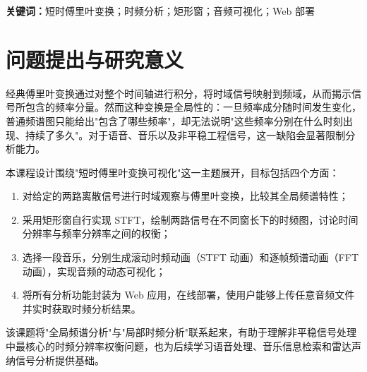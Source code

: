 \documentclass[12pt,a4paper,UTF8]{ctexart}
\begin{document}
\cover
\thispagestyle{empty}

\newpage
\setcounter{page}{1}

\begin{abstract}
傅里叶变换能够揭示信号的全局频率组成，但无法回答"某个频率在什么时候出现"这一时变分析问题。针对该局限，本文围绕短时傅里叶变换（Short-Time Fourier Transform, STFT）展开课程设计。首先，通过 \texttt{waveform.py} 绘制两路离散信号的时域波形，再利用 \texttt{fft\_analyze.py} 调用手写数值傅里叶变换验证两者在全局频谱上几乎一致；随后基于 \texttt{stft\_analyzer.py} 实现的滑动矩形窗逐帧变换，绘制不同窗长下的时频图，分析时间分辨率与频率分辨率之间的权衡；最后以自选音乐为对象，利用 \texttt{stft\_animator.py} 与 \texttt{fft\_animator.py} 分别生成滚动时频动画与彩虹雨频谱动画，并将所有分析功能封装为 Flask 后端 API，结合 Vue.js 前端部署为可交互网站。实验结果表明：仅观察频谱图无法区分局部时序结构，而 STFT 可有效揭示两路信号在频率出现顺序上的差异；窗长减小时时频图边界更清晰但频率纹理变粗；对于音乐信号，STFT 能直观反映主旋律、谐波和瞬态打击成分的时间演化。
\end{abstract}

\noindent\textbf{关键词：}短时傅里叶变换；时频分析；矩形窗；音频可视化；Web 部署

\section{问题提出与研究意义}
经典傅里叶变换通过对整个时间轴进行积分，将时域信号映射到频域，从而揭示信号所包含的频率分量。然而这种变换是全局性的：一旦频率成分随时间发生变化，普通频谱图只能给出"包含了哪些频率"，却无法说明"这些频率分别在什么时刻出现、持续了多久"。对于语音、音乐以及非平稳工程信号，这一缺陷会显著限制分析能力。

本课程设计围绕"短时傅里叶变换可视化"这一主题展开，目标包括四个方面：
\begin{enumerate}
    \item 对给定的两路离散信号进行时域观察与傅里叶变换，比较其全局频谱特性；
    \item 采用矩形窗自行实现 STFT，绘制两路信号在不同窗长下的时频图，讨论时间分辨率与频率分辨率之间的权衡；
    \item 选择一段音乐，分别生成滚动时频动画（STFT 动画）和逐帧频谱动画（FFT 动画），实现音频的动态可视化；
    \item 将所有分析功能封装为 Web 应用，在线部署，使用户能够上传任意音频文件并实时获取时频分析结果。
\end{enumerate}

该课题将"全局频谱分析"与"局部时频分析"联系起来，有助于理解非平稳信号处理中最核心的时频分辨率权衡问题，也为后续学习语音处理、音乐信息检索和雷达声纳信号分析提供基础。
\end{document}
